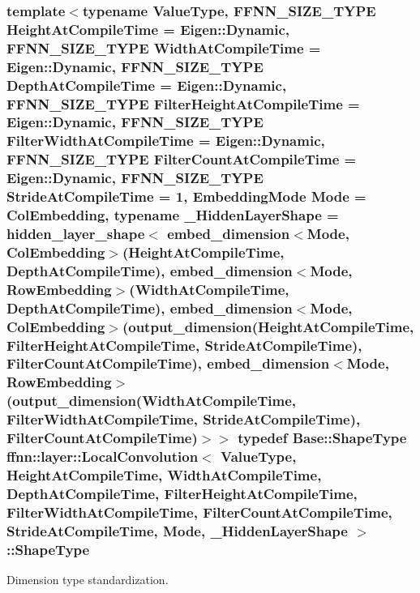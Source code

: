\hypertarget{classffnn_1_1layer_1_1_local_convolution_a2f1b1364ef9d3eefc517184e2cd1115b}{
\subsubsection[{Shape\-Type}]{\setlength{\rightskip}{0pt plus 5cm}template$<$typename Value\-Type, F\-F\-N\-N\-\_\-\-S\-I\-Z\-E\-\_\-\-T\-Y\-P\-E Height\-At\-Compile\-Time = Eigen\-::\-Dynamic, F\-F\-N\-N\-\_\-\-S\-I\-Z\-E\-\_\-\-T\-Y\-P\-E Width\-At\-Compile\-Time = Eigen\-::\-Dynamic, F\-F\-N\-N\-\_\-\-S\-I\-Z\-E\-\_\-\-T\-Y\-P\-E Depth\-At\-Compile\-Time = Eigen\-::\-Dynamic, F\-F\-N\-N\-\_\-\-S\-I\-Z\-E\-\_\-\-T\-Y\-P\-E Filter\-Height\-At\-Compile\-Time = Eigen\-::\-Dynamic, F\-F\-N\-N\-\_\-\-S\-I\-Z\-E\-\_\-\-T\-Y\-P\-E Filter\-Width\-At\-Compile\-Time = Eigen\-::\-Dynamic, F\-F\-N\-N\-\_\-\-S\-I\-Z\-E\-\_\-\-T\-Y\-P\-E Filter\-Count\-At\-Compile\-Time = Eigen\-::\-Dynamic, F\-F\-N\-N\-\_\-\-S\-I\-Z\-E\-\_\-\-T\-Y\-P\-E Stride\-At\-Compile\-Time = 1, Embedding\-Mode Mode = Col\-Embedding, typename \-\_\-\-Hidden\-Layer\-Shape = hidden\-\_\-layer\-\_\-shape$<$              embed\-\_\-dimension$<$\-Mode, Col\-Embedding$>$(\-Height\-At\-Compile\-Time, Depth\-At\-Compile\-Time),              embed\-\_\-dimension$<$\-Mode, Row\-Embedding$>$(\-Width\-At\-Compile\-Time,  Depth\-At\-Compile\-Time),              embed\-\_\-dimension$<$\-Mode, Col\-Embedding$>$(output\-\_\-dimension(\-Height\-At\-Compile\-Time, Filter\-Height\-At\-Compile\-Time, Stride\-At\-Compile\-Time), Filter\-Count\-At\-Compile\-Time),              embed\-\_\-dimension$<$\-Mode, Row\-Embedding$>$(output\-\_\-dimension(\-Width\-At\-Compile\-Time,  Filter\-Width\-At\-Compile\-Time,  Stride\-At\-Compile\-Time), Filter\-Count\-At\-Compile\-Time)$>$$>$ typedef {\bf Base\-::\-Shape\-Type} {\bf ffnn\-::layer\-::\-Local\-Convolution}$<$ Value\-Type, Height\-At\-Compile\-Time, Width\-At\-Compile\-Time, Depth\-At\-Compile\-Time, Filter\-Height\-At\-Compile\-Time, Filter\-Width\-At\-Compile\-Time, Filter\-Count\-At\-Compile\-Time, Stride\-At\-Compile\-Time, Mode, \-\_\-\-Hidden\-Layer\-Shape $>$\-::{\bf Shape\-Type}}}\label{classffnn_1_1layer_1_1_local_convolution_a2f1b1364ef9d3eefc517184e2cd1115b}


Dimension type standardization. 

